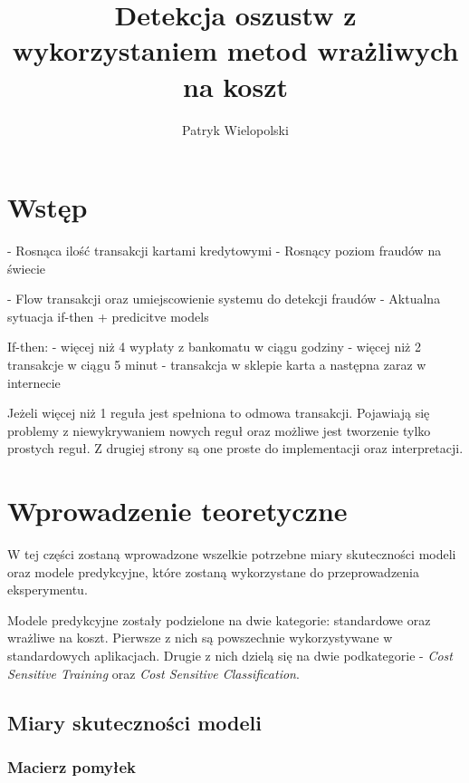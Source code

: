\documentclass{book}
\title{Detekcja oszustw z wykorzystaniem metod wrażliwych na koszt}
\author{Patryk Wielopolski}
\begin{document}
	
	\newcommand{\htx}{h_{\theta}(\boldsymbol{x_i})}
	\newcommand{\es}{\mathcal{S}}
	\newcommand{\iks}{\boldsymbol{x}}
	
	\newenvironment{talign}
	{\align}
	{\endalign}
	
	\newenvironment{talign*}
	{\csname align*\endcsname}
	{\endalign}

\maketitle

\chapter{Wstęp}
	- Rosnąca ilość transakcji kartami kredytowymi
	- Rosnący poziom fraudów na świecie
	
	- Flow transakcji oraz umiejscowienie systemu do detekcji fraudów
	- Aktualna sytuacja if-then + predicitve models
	
	If-then:
	- więcej niż 4 wypłaty z bankomatu w ciągu godziny
	- więcej niż 2 transakcje w ciągu 5 minut
	- transakcja w sklepie karta a następna zaraz w internecie
	
	Jeżeli więcej niż 1 reguła jest spełniona to odmowa transakcji. Pojawiają się problemy z niewykrywaniem nowych reguł oraz możliwe jest tworzenie tylko prostych reguł. Z drugiej strony są one proste do implementacji oraz interpretacji.
	

\chapter{Wprowadzenie teoretyczne}

W tej części zostaną wprowadzone wszelkie potrzebne miary skuteczności modeli oraz modele predykcyjne, które zostaną wykorzystane do przeprowadzenia eksperymentu. 

Modele predykcyjne zostały podzielone na dwie kategorie: standardowe oraz wrażliwe na koszt. Pierwsze z nich są powszechnie wykorzystywane w standardowych aplikacjach. Drugie z nich dzielą się na dwie podkategorie - \textit{Cost Sensitive Training} oraz \textit{Cost Sensitive Classification}.

\section{Miary skuteczności modeli}

\subsection{Macierz pomyłek}
\end{document}
